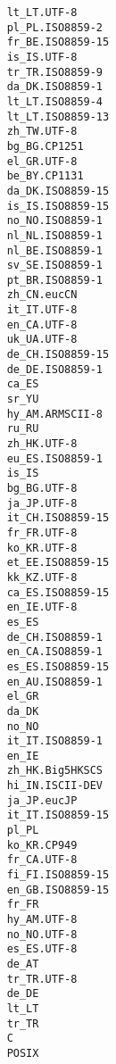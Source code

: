 \documentclass[a4paper,12pt]{jarticle}
\begin{document}
\begin{itemize}
\begin{lstlisting}
    lt_LT.UTF-8
    pl_PL.ISO8859-2
    fr_BE.ISO8859-15
    is_IS.UTF-8
    tr_TR.ISO8859-9
    da_DK.ISO8859-1
    lt_LT.ISO8859-4
    lt_LT.ISO8859-13
    zh_TW.UTF-8
    bg_BG.CP1251
    el_GR.UTF-8
    be_BY.CP1131
    da_DK.ISO8859-15
    is_IS.ISO8859-15
    no_NO.ISO8859-1
    nl_NL.ISO8859-1
    nl_BE.ISO8859-1
    sv_SE.ISO8859-1
    pt_BR.ISO8859-1
    zh_CN.eucCN
    it_IT.UTF-8
    en_CA.UTF-8
    uk_UA.UTF-8
    de_CH.ISO8859-15
    de_DE.ISO8859-1
    ca_ES
    sr_YU
    hy_AM.ARMSCII-8
    ru_RU
    zh_HK.UTF-8
    eu_ES.ISO8859-1
    is_IS
    bg_BG.UTF-8
    ja_JP.UTF-8
    it_CH.ISO8859-15
    fr_FR.UTF-8
    ko_KR.UTF-8
    et_EE.ISO8859-15
    kk_KZ.UTF-8
    ca_ES.ISO8859-15
    en_IE.UTF-8
    es_ES
    de_CH.ISO8859-1
    en_CA.ISO8859-1
    es_ES.ISO8859-15
    en_AU.ISO8859-1
    el_GR
    da_DK
    no_NO
    it_IT.ISO8859-1
    en_IE
    zh_HK.Big5HKSCS
    hi_IN.ISCII-DEV
    ja_JP.eucJP
    it_IT.ISO8859-15
    pl_PL
    ko_KR.CP949
    fr_CA.UTF-8
    fi_FI.ISO8859-15
    en_GB.ISO8859-15
    fr_FR
    hy_AM.UTF-8
    no_NO.UTF-8
    es_ES.UTF-8
    de_AT
    tr_TR.UTF-8
    de_DE
    lt_LT
    tr_TR
    C
    POSIX
                           \end{lstlisting}
\end{itemize}
\end{document}
